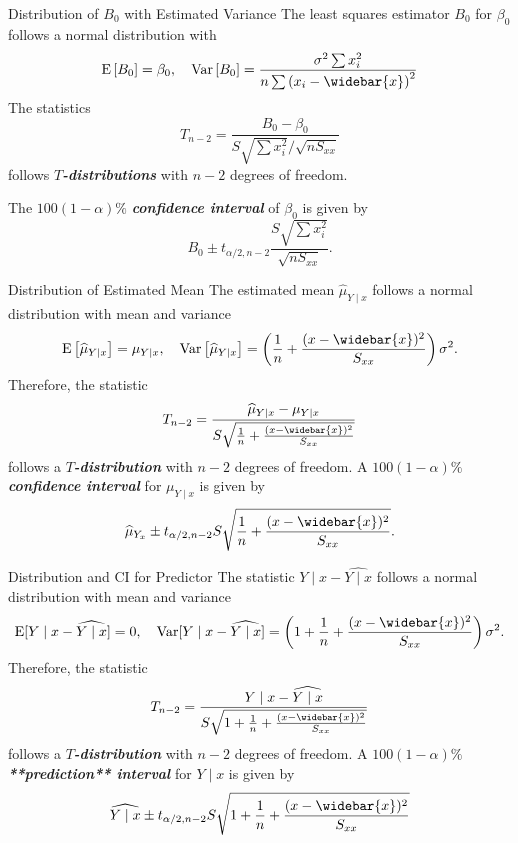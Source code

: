 \documentclass{beamer}
\newcommand{\bb}[1]{\textcolor{antiquefuchsia}{\textbf{\textit{#1}}}}
\begin{document}
\begin{frame}{Distribution of $B_0$ with Estimated Variance}
The least squares estimator $B_{0}$ for $\beta_{0}$ follows a normal distribution with
$$
\mathrm{E}\left[B_{0}\right]=\beta_{0}, \quad \operatorname{Var}\left[B_{0}\right]=\frac{\sigma^{2} \sum x_{i}^{2}}{n \sum\left(x_{i}-\widebar{x}\right)^{2}}
$$
The statistics
$$
T_{n-2}=\frac{B_{0}-\beta_{0}}{S \sqrt{\sum x_{i}^{2}} / \sqrt{n S_{x x}}}
$$
follows \bb{$T$-distributions} with $n-2$ degrees of freedom.

The $100(1-\alpha) \%$ \bb{confidence interval} of $\beta_{0}$ is given by
$$
B_{0} \pm t_{\alpha / 2, n-2} \frac{S \sqrt{\sum x_{i}^{2}}}{\sqrt{n S_{x x}}} .
$$
\end{frame}

\begin{frame}{Distribution of Estimated Mean}
The estimated mean $\widehat{\mu}_{Y \mid x}$ follows a normal distribution with mean and variance
$$
\mathrm{E}\left[\widehat{\mu}_{Y \mid x}\right]=\mu_{Y \mid x}, \quad \operatorname{Var}\left[\widehat{\mu}_{Y \mid x}\right]=\left(\frac{1}{n}+\frac{(x-\widebar{x})^{2}}{S_{x x}}\right) \sigma^{2} .
$$
Therefore, the statistic
$$
T_{n-2}=\frac{\widehat{\mu}_{Y \mid x}-\mu_{Y \mid x}}{S \sqrt{\frac{1}{n}+\frac{(x-\widebar{x})^{2}}{S_{x x}}}}
$$
follows a \bb{$T$-distribution} with $n-2$ degrees of freedom. A $100(1-\alpha) \%$ \bb{confidence interval} for $\mu_{Y \mid x}$ is given by
$$
\widehat{\mu}_{Y_{x}} \pm t_{\alpha / 2, n-2} S \sqrt{\frac{1}{n}+\frac{(x-\widebar{x})^{2}}{S_{x x}}} .
$$
\end{frame}

\begin{frame}{Distribution and CI for Predictor}
The statistic $Y \mid x-\widehat{Y \mid x}$ follows a normal distribution with mean and variance
$$
\mathrm{E}[Y \mid x-\widehat{Y \mid x}]=0, \quad \operatorname{Var}[Y \mid x-\widehat{Y \mid x}]=\left(1+\frac{1}{n}+\frac{(x-\widebar{x})^{2}}{S_{x x}}\right) \sigma^{2} .
$$
Therefore, the statistic
$$
T_{n-2}=\frac{Y \mid x-\widehat{Y \mid x}}{S \sqrt{1+\frac{1}{n}+\frac{(x-\widebar{x})^{2}}{S_{x x}}}}
$$
follows a \bb{$T$-distribution} with $n-2$ degrees of freedom. A $100(1-\alpha) \%$ \bb{**prediction** interval} for $Y \mid x$ is given by
$$
\widehat{Y \mid x} \pm t_{\alpha / 2, n-2} S \sqrt{1+\frac{1}{n}+\frac{(x-\widebar{x})^{2}}{S_{x x}}}
$$
\end{frame}
\end{document}
